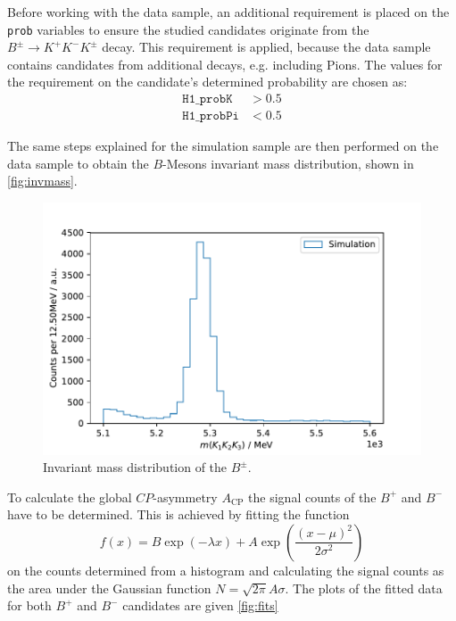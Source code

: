 Before working with the data sample, an additional requirement is placed 
on the \texttt{prob} variables to ensure the studied candidates originate 
from the $B^\pm \rightarrow K^+ K^- K^\pm$ decay. This requirement is applied, 
because the data sample contains candidates from additional decays, e.g. 
including Pions. The values for the requirement on the candidate's determined 
probability are chosen as: 
\begin{align}
	\mathtt{H1\_probK} &> 0.5\\
	\mathtt{H1\_probPi} &< 0.5
\end{align}

The same steps explained for the simulation sample are then performed on the 
data sample to obtain the $B$-Mesons invariant mass distribution, shown in \autoref{fig:invmass}. 

\begin{figure}
	\centering
	\includegraphics[width=0.6\linewidth]{content/pictures/image_fin/invmass}
	\caption{Invariant mass distribution of the $B^\pm$.}
	\label{fig:invmass}
\end{figure}
To calculate the global $CP$-asymmetry $A_\mathrm{CP}$ the signal counts of the 
$B^+$ and $B^-$ have to be determined. This is achieved by fitting the function 
\begin{equation}
	f(x) = B\exp\left(-\lambda x\right) + A  \exp\left(\frac{(x-\mu)^2}{2\sigma^2}\right)
	\label{eq:fit}
\end{equation} 
on the counts determined from a histogram and calculating the signal counts as 
the area under the Gaussian function $N=\sqrt{2\pi}A\sigma$. The plots of the 
fitted data for both $B^+$ and $B^-$ candidates are given \autoref{fig:fits}


